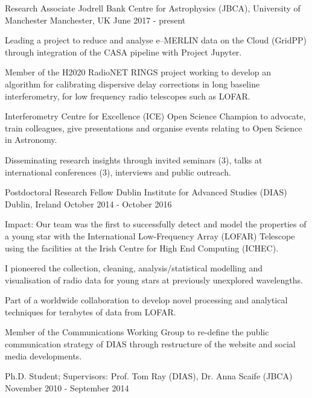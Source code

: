 \begin{cventries}
  \cventry
    {Research Associate}
    {Jodrell Bank Centre for Astrophysics (JBCA), University of Manchester}
    {Manchester, UK}
    {June 2017 - present}
    {
      \begin{cvitems}
        \item {Leading a project to reduce and analyse e--MERLIN data on the Cloud (GridPP) through integration of the CASA pipeline with Project Jupyter.}
        \item {Member of the H2020 RadioNET RINGS project working to develop an algorithm for calibrating dispersive delay corrections in long baseline interferometry, for low frequency radio telescopes such as LOFAR.}
        \item {Interferometry Centre for Excellence (ICE) Open Science Champion to advocate, train colleagues, give presentations and organise events relating to Open Science in Astronomy.}
        \item {Disseminating research insights through invited seminars (3), talks at international conferences (3), interviews and public outreach.}
      \end{cvitems}
    }
\cventry
    {Postdoctoral Research Fellow}
    {Dublin Institute for Advanced Studies (DIAS)}
    {Dublin, Ireland}
    {October 2014 - October 2016}
    {
      \begin{cvitems}
        \item{Impact: Our team was the first to successfully detect and model the properties of a young star with the International Low-Frequency Array (LOFAR) Telescope using the facilities at the Irish Centre for High End Computing (ICHEC).}        
        \item {I pioneered the collection, cleaning, analysis/statistical modelling and visualisation of radio data for young stars at previously unexplored wavelengths.}
        \item {Part of a worldwide collaboration to develop novel processing and analytical techniques for terabytes of data from LOFAR.}
        \item {Member of the Communications Working Group to re-define the public communication strategy of DIAS through restructure of the website and social media developments.}
      \end{cvitems}
    }
  \cventry
    {Ph.D. Student; Supervisors: Prof. Tom Ray (DIAS), Dr. Anna Scaife (JBCA)}
    {}
    {}
    {November 2010 - September 2014}
    {
      \begin{cvitems}

\end{cvitems}}
\end{cventries}
